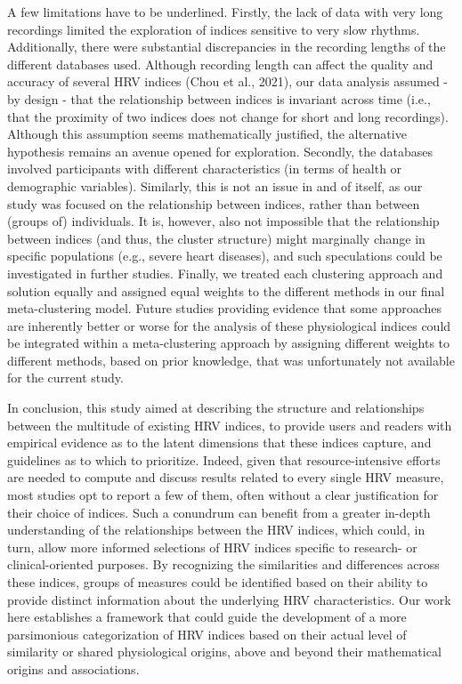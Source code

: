 \documentclass[
  english,
  jou,floatsintext]{apa6}
\begin{document}
A few limitations have to be underlined. Firstly, the lack of data with very long recordings limited the exploration of indices sensitive to very slow rhythms. Additionally, there were substantial discrepancies in the recording lengths of the different databases used. Although recording length can affect the quality and accuracy of several HRV indices (Chou et al., 2021), our data analysis assumed - by design - that the relationship between indices is invariant across time (i.e., that the proximity of two indices does not change for short and long recordings). Although this assumption seems mathematically justified, the alternative hypothesis remains an avenue opened for exploration. Secondly, the databases involved participants with different characteristics (in terms of health or demographic variables). Similarly, this is not an issue in and of itself, as our study was focused on the relationship between indices, rather than between (groups of) individuals. It is, however, also not impossible that the relationship between indices (and thus, the cluster structure) might marginally change in specific populations (e.g., severe heart diseases), and such speculations could be investigated in further studies. Finally, we treated each clustering approach and solution equally and assigned equal weights to the different methods in our final meta-clustering model. Future studies providing evidence that some approaches are inherently better or worse for the analysis of these physiological indices could be integrated within a meta-clustering approach by assigning different weights to different methods, based on prior knowledge, that was unfortunately not available for the current study.

In conclusion, this study aimed at describing the structure and relationships between the multitude of existing HRV indices, to provide users and readers with empirical evidence as to the latent dimensions that these indices capture, and guidelines as to which to prioritize. Indeed, given that resource-intensive efforts are needed to compute and discuss results related to every single HRV measure, most studies opt to report a few of them, often without a clear justification for their choice of indices. Such a conundrum can benefit from a greater in-depth understanding of the relationships between the HRV indices, which could, in turn, allow more informed selections of HRV indices specific to research- or clinical-oriented purposes. By recognizing the similarities and differences across these indices, groups of measures could be identified based on their ability to provide distinct information about the underlying HRV characteristics. Our work here establishes a framework that could guide the development of a more parsimonious categorization of HRV indices based on their actual level of similarity or shared physiological origins, above and beyond their mathematical origins and associations.
\end{document}
